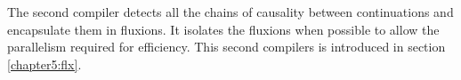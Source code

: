 The second compiler detects all the chains of causality between continuations and encapsulate them in fluxions.
It isolates the fluxions when possible to allow the parallelism required for efficiency.
This second compilers is introduced in section \ref{chapter5:flx}.



% 
